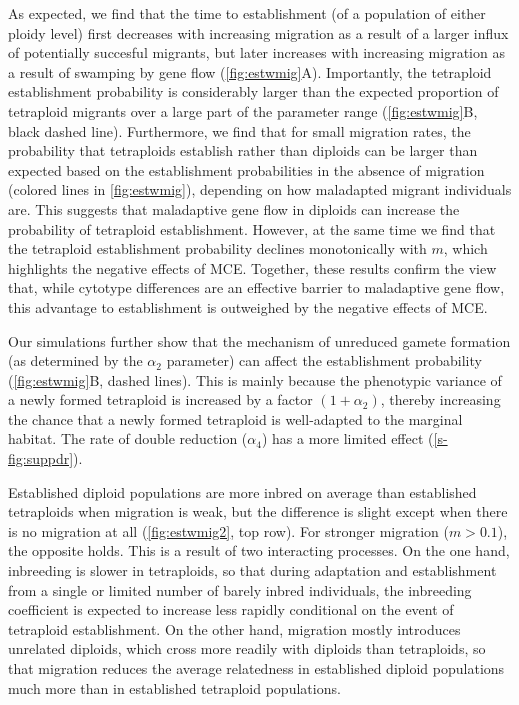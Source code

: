 \documentclass[12pt,a4paper]{article}
\begin{document}
As expected, we find that the time to establishment (of a population of either
ploidy level) first decreases with increasing migration as a result of a larger
influx of potentially succesful migrants, but later increases with increasing
migration as a result of swamping by gene flow (\cref{fig:estwmig}A).
Importantly, the tetraploid establishment probability is considerably larger
than the expected proportion of tetraploid migrants over a large part of the
parameter range (\cref{fig:estwmig}B, black dashed line).
Furthermore, we find that for small migration rates, the probability that
tetraploids establish rather than diploids can be larger than expected based on
the establishment probabilities in the absence of migration (colored lines in
\cref{fig:estwmig}), depending on how maladapted migrant individuals are.
This suggests that maladaptive gene flow in diploids can increase the
probability of tetraploid establishment.
However, at the same time we find that the tetraploid establishment probability
declines monotonically with $m$, which highlights the negative effects of MCE.
Together, these results confirm the view that, while cytotype differences are an
effective barrier to maladaptive gene flow, this advantage to establishment is
outweighed by the negative effects of MCE.

Our simulations further show that the mechanism of unreduced gamete formation
(as determined by the $\alpha_2$ parameter) can affect the establishment
probability (\cref{fig:estwmig}B, dashed lines).
This is mainly because the phenotypic variance of a newly formed tetraploid is
increased by a factor $(1+\alpha_2)$, thereby increasing the chance that a
newly formed tetraploid is well-adapted to the marginal habitat.
The rate of double reduction ($\alpha_4$) has a more limited effect
(\cref{s-fig:suppdr}).

Established diploid populations are more inbred on average than established
tetraploids when migration is weak, but the difference is slight except when
there is no migration at all (\cref{fig:estwmig2}, top row).
For stronger migration ($m > 0.1$), the opposite holds.
This is a result of two interacting processes.
On the one hand, inbreeding is slower in tetraploids, so that during adaptation
and establishment from a single or limited number of barely inbred individuals, 
the inbreeding coefficient is expected to increase less rapidly conditional on
the event of tetraploid establishment.
On the other hand, migration mostly introduces unrelated diploids, which cross
more readily with diploids than tetraploids, so that migration reduces the
average relatedness in established diploid populations much more than in
established tetraploid populations.
\end{document}
